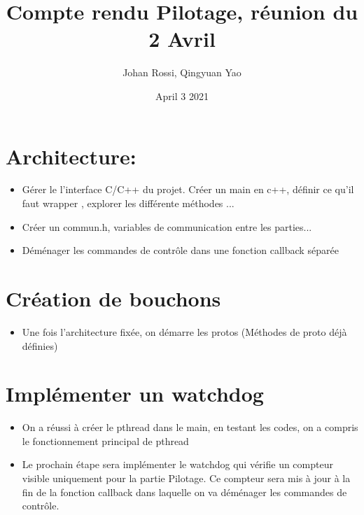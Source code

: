 \documentclass{article}
\title{Compte rendu Pilotage, réunion du 2 Avril}
\author{Johan Rossi, Qingyuan Yao}
\date{April 3 2021}
\begin{document}
\maketitle

\section{Architecture:}
\begin{itemize}
    \item Gérer le l'interface C/C++ du projet. Créer un main en c++, définir ce qu'il faut wrapper , explorer les différente méthodes ...
    \item Créer un commun.h, variables de communication entre les parties...
    \item Déménager les commandes de contrôle dans une fonction callback séparée
\end{itemize}

\section{Création de bouchons}
\begin{itemize}
    \item Une fois l'architecture fixée, on démarre les protos (Méthodes de proto déjà définies)
\end{itemize}

\section{Implémenter un watchdog}
\begin{itemize}
    \item On a réussi à créer le pthread dans le main, en testant les codes, on a compris le fonctionnement principal de pthread
    \item Le prochain étape sera implémenter le watchdog qui vérifie un compteur visible uniquement pour la partie Pilotage. Ce compteur sera mis à jour à la fin de la fonction callback dans laquelle on va déménager les commandes de contrôle.
\end{itemize}
\end{document}
